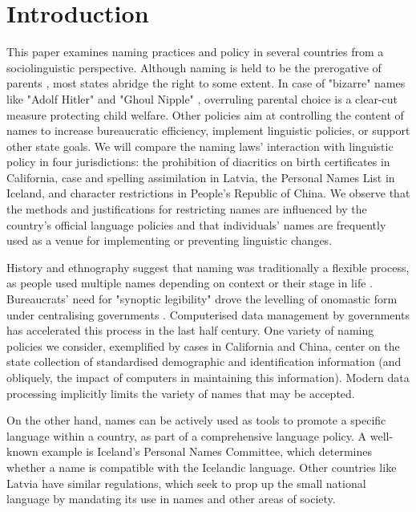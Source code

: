 \section{Introduction}

This paper examines naming practices and policy in several countries from a
sociolinguistic perspective. Although naming is held to be the prerogative of
parents \parencite{alford87}, most states abridge the right to some extent. In
case of "bizarre" names like "Adolf Hitler" and "Ghoul Nipple"
\parencite{larson11}, overruling parental choice is a clear-cut measure
protecting child welfare. Other policies aim at controlling the content of
names to increase bureaucratic efficiency, implement linguistic policies, or
support other state goals. We will compare the naming laws' interaction with
linguistic policy in four jurisdictions: the prohibition of diacritics on birth
certificates in California, case and spelling assimilation in Latvia, the
Personal Names List in Iceland, and character restrictions in People's Republic
of China. We observe that the methods and justifications for restricting names
are influenced by the country's official language policies and that
individuals' names are frequently used as a venue for implementing or
preventing linguistic changes.

History and ethnography suggest that naming was traditionally a flexible
process, as people used multiple names depending on context or their stage in
life \parencite{alford87} \parencite{scott02}. Bureaucrats' need for "synoptic
legibility" drove the levelling of onomastic form under centralising
governments \parencite{scott02}. Computerised data management by governments
has accelerated this process in the last half century. One variety of naming
policies we consider, exemplified by cases in California and China, center on
the state collection of standardised demographic and identification information
(and obliquely, the impact of computers in maintaining this information).
Modern data processing implicitly limits the variety of names that may be
accepted.

On the other hand, names can be actively used as tools to promote a specific
language within a country, as part of a comprehensive language policy. A
well-known example is Iceland's Personal Names Committee, which determines
whether a name is compatible with the Icelandic language. Other countries like
Latvia have similar regulations, which seek to prop up the small national
language by mandating its use in names and other areas of society.

